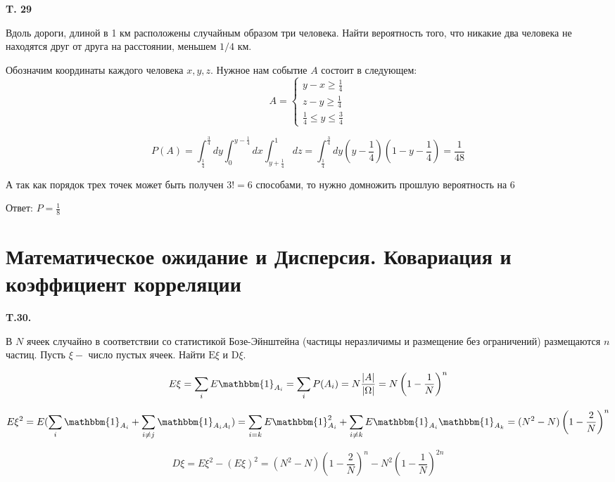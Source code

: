 \documentclass[a4paper,12pt]{article} %
\begin{document}
\begin{example} \textbf{T. 29 }

Вдоль дороги, длиной в 1 км расположены случайным образом три человека. 
Найти вероятность того, что никакие два человека не находятся друг от друга на расстоянии, меньшем $1 / 4$ км.

Обозначим координаты каждого человека $ x,y,z$. Нужное нам событие $A$ состоит в следующем:
\[  A=
\begin{cases} 
	y-x \ge \frac{1}{4} \\ 
	z-y \ge \frac{1}{4} \\ 
	\frac{1}{4}\le y \le \frac{3}{4}
\end{cases}  \]

\[ P(A)=\int_{\frac{1}{4}}^{\frac{3}{4}} dy \int_{0}^{y-\frac{1}{4}} dx \int_{y+\frac{1}{4}}^{1}dz= 
\int_{\frac{1}{4}}^{\frac{3}{4}} dy \left(y-\frac{1}{4}\right)\left(1-y-\frac{1}{4}\right)=\frac{1}{48}\]

А так как порядок трех точек может быть получен $ 3!=6$ способами, то нужно домножить прошлую вероятность на 6

Ответ: $ P=\frac{1}{8} $

\end{example}







\section{Математическое ожидание и Дисперсия. Ковариация и коэффициент корреляции}


\begin{example} \textbf{T.30.} 

В $N$ ячеек случайно в соответствии со статистикой Бозе-Эйнштейна (частицы неразличимы и размещение без ограничений) размещаются $n$ частиц. Пусть $\xi-$ число пустых ячеек. Найти $\mathrm{E} \xi$ и $\mathrm{D} \xi$.

\[ E \xi = \sum_i E \mathbbm{1}_{A_i}=
\sum_i P(A_i) = N \frac{|A|}{|\Omega|}=
N  \left(1-\frac{1}{N}\right)^n\]




\[ E\xi^2 = 
E(\sum_{i}\mathbbm{1}_{A_i} +\sum_{i\ne j}\mathbbm{1}_{A_i A_l})=
\sum_{i=k}E \mathbbm{1}_{A_i}^2+\sum_{i\ne k}E \mathbbm{1}_{A_i} \mathbbm{1}_{A_k}=
(N^2-N)\left(1- \frac{2}{N}\right)^n
\]



\[ D\xi = E\xi^2 - (E\xi)^2 =
(N^2-N)\left(1- \frac{2}{N}\right)^n-N^2\left(1-\frac{1}{N}\right)^{2n} \]


\end{example}
\end{document}
